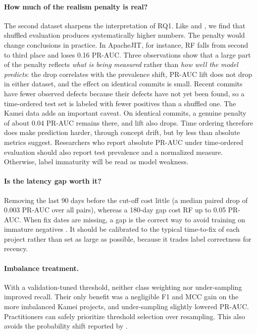 \documentclass[11pt,a4paper]{article}
\begin{document}
\paragraph{How much of the realism penalty is real?} The second dataset sharpens the interpretation of RQ1. Like \citet{falessi2020} and \citet{song2023a}, we find that shuffled evaluation produces systematically higher numbers. The penalty would change conclusions in practice. In ApacheJIT, for instance, RF falls from second to third place and loses 0.16 PR-AUC. Three observations show that a large part of the penalty reflects \emph{what is being measured} rather than \emph{how well the model predicts}: the drop correlates with the prevalence shift, PR-AUC lift does not drop in either dataset, and the effect on identical commits is small. Recent commits have fewer observed defects because their defects have not yet been found, so a time-ordered test set is labeled with fewer positives than a shuffled one. The Kamei data adds an important caveat. On identical commits, a genuine penalty of about 0.04 PR-AUC remains there, and lift also drops. Time ordering therefore does make prediction harder, through concept drift, but by less than absolute metrics suggest. Researchers who report absolute PR-AUC under time-ordered evaluation should also report test prevalence and a normalized measure. Otherwise, label immaturity will be read as model weakness.

\paragraph{Is the latency gap worth it?} Removing the last 90 days before the cut-off cost little (a median paired drop of 0.003 PR-AUC over all pairs), whereas a 180-day gap cost RF up to 0.05 PR-AUC. When fix dates are missing, a gap is the correct way to avoid training on immature negatives \citep{cabral2019}. It should be calibrated to the typical time-to-fix of each project rather than set as large as possible, because it trades label correctness for recency.

\paragraph{Imbalance treatment.} With a validation-tuned threshold, neither class weighting nor under-sampling improved recall. Their only benefit was a negligible F1 and MCC gain on the more imbalanced Kamei projects, and under-sampling slightly lowered PR-AUC. Practitioners can safely prioritize threshold selection over resampling. This also avoids the probability shift reported by \citet{tantithamthavorn2020}.
\end{document}
